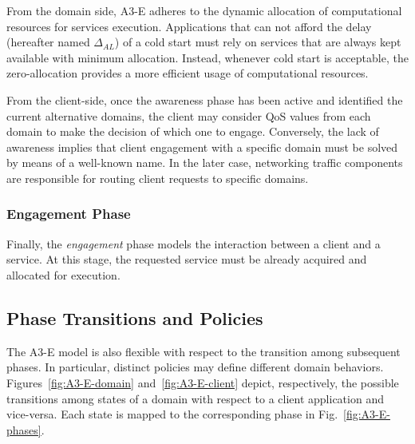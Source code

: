 From the domain side, A3-E adheres to the dynamic allocation of computational resources for services execution. Applications that can not afford the delay (hereafter named $\Delta_{AL}$) of a cold start must rely on services that are always kept available with minimum allocation. Instead, whenever cold start is acceptable, the zero-allocation provides a more efficient usage of computational resources.

From the client-side, once the awareness phase has been active and identified the current alternative domains, the client may consider QoS values from each domain to make the decision of which one to engage. Conversely, the lack of awareness implies that client engagement with a specific domain must be solved by means of a well-known name. In the later case, networking traffic components are responsible for routing client requests to specific domains.

\subsubsection{Engagement Phase}\label{sec:A3-E-engagement}

Finally, the \textit{engagement} phase models the interaction between a client and a service. At this stage, the requested service must be already acquired and allocated for execution. 

\subsection{Phase Transitions and Policies}

The A3-E model is also flexible with respect to the transition among subsequent phases. In particular, distinct policies may define different domain behaviors. Figures~\ref{fig:A3-E-domain} and~\ref{fig:A3-E-client} depict, respectively, the possible transitions among states of a domain with respect to a client application and vice-versa. Each state is mapped to the corresponding phase in Fig.~\ref{fig:A3-E-phases}.

